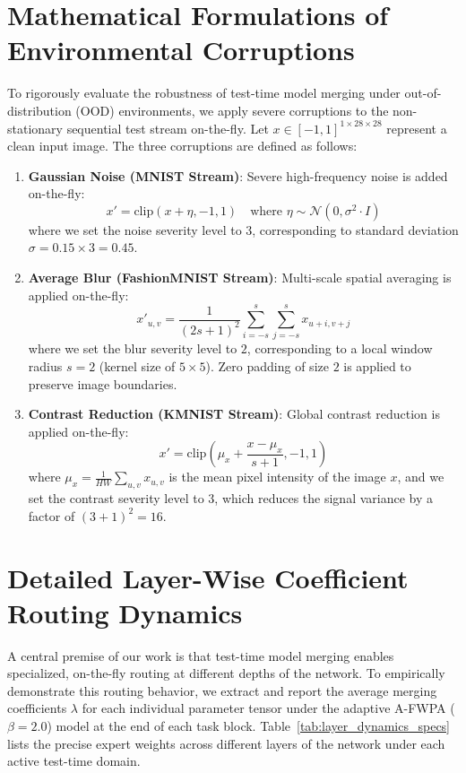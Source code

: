 \documentclass{article}
\theoremstyle{plain}
\theoremstyle{definition}
\theoremstyle{remark}
\begin{document}
\section{Mathematical Formulations of Environmental Corruptions}
\label{app:corruptions}
To rigorously evaluate the robustness of test-time model merging under out-of-distribution (OOD) environments, we apply severe corruptions to the non-stationary sequential test stream on-the-fly. Let $x \in [-1, 1]^{1 \times 28 \times 28}$ represent a clean input image. The three corruptions are defined as follows:

\begin{enumerate}
    \item \textbf{Gaussian Noise (MNIST Stream)}: Severe high-frequency noise is added on-the-fly:
    \begin{equation}
        x' = \text{clip}(x + \eta, -1, 1) \quad \text{where } \eta \sim \mathcal{N}(0, \sigma^2 \cdot I)
    \end{equation}
    where we set the noise severity level to $3$, corresponding to standard deviation $\sigma = 0.15 \times 3 = 0.45$.
    
    \item \textbf{Average Blur (FashionMNIST Stream)}: Multi-scale spatial averaging is applied on-the-fly:
    \begin{equation}
        x'_{u, v} = \frac{1}{(2s+1)^2} \sum_{i=-s}^{s} \sum_{j=-s}^{s} x_{u+i, v+j}
    \end{equation}
    where we set the blur severity level to $2$, corresponding to a local window radius $s = 2$ (kernel size of $5 \times 5$). Zero padding of size $2$ is applied to preserve image boundaries.
    
    \item \textbf{Contrast Reduction (KMNIST Stream)}: Global contrast reduction is applied on-the-fly:
    \begin{equation}
        x' = \text{clip}\left(\mu_x + \frac{x - \mu_x}{s + 1}, -1, 1\right)
    \end{equation}
    where $\mu_x = \frac{1}{HW}\sum_{u, v} x_{u, v}$ is the mean pixel intensity of the image $x$, and we set the contrast severity level to $3$, which reduces the signal variance by a factor of $(3+1)^2 = 16$.
\end{enumerate}

\section{Detailed Layer-Wise Coefficient Routing Dynamics}
\label{app:layer_dynamics}
A central premise of our work is that test-time model merging enables specialized, on-the-fly routing at different depths of the network. To empirically demonstrate this routing behavior, we extract and report the average merging coefficients $\lambda$ for each individual parameter tensor under the adaptive A-FWPA ($\beta = 2.0$) model at the end of each task block. Table~\ref{tab:layer_dynamics_specs} lists the precise expert weights across different layers of the network under each active test-time domain.
\end{document}

